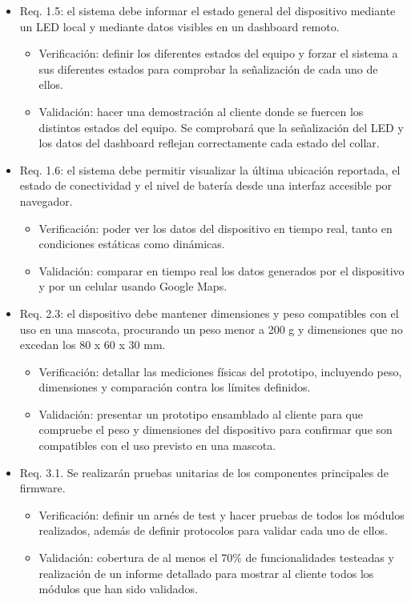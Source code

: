 \documentclass[
11pt, %
]{charter}
\begin{document}
\begin{itemize}
	\item Req. 1.5: el sistema debe informar el estado general del dispositivo mediante un LED local y mediante datos visibles en un dashboard remoto.
	\begin{itemize}
		\item Verificación: definir los diferentes estados del equipo y forzar el sistema a sus diferentes estados para comprobar la señalización de cada uno de ellos.
		\item Validación: hacer una demostración al cliente donde se fuercen los distintos estados del equipo. Se comprobará que la señalización del LED y los datos del dashboard reflejan correctamente cada estado del collar.
	\end{itemize}

	\item Req. 1.6: el sistema debe permitir visualizar la última ubicación reportada, el estado de conectividad y el nivel de batería desde una interfaz accesible por navegador.
	\begin{itemize}
		\item Verificación: poder ver los datos del dispositivo en tiempo real, tanto en condiciones estáticas como dinámicas.
		\item Validación: comparar en tiempo real los datos generados por el dispositivo y por un celular usando Google Maps.
	\end{itemize}

	\item Req. 2.3: el dispositivo debe mantener dimensiones y peso compatibles con el uso en una mascota, procurando un peso menor a 200 g y dimensiones que no excedan los 80 x 60 x 30 mm.
	\begin{itemize}
		\item Verificación: detallar las mediciones físicas del prototipo, incluyendo peso, dimensiones y comparación contra los límites definidos.
		\item Validación: presentar un prototipo ensamblado al cliente para que compruebe el peso y dimensiones del dispositivo para confirmar que son compatibles con el uso previsto en una mascota.
	\end{itemize}


	\item Req. 3.1. Se realizarán pruebas unitarias de los componentes principales de firmware.
	\begin{itemize}
		\item Verificación: definir un arnés de test y hacer pruebas de todos los módulos realizados, además de definir protocolos para validar cada uno de ellos.
		\item Validación: cobertura de al menos el 70\% de funcionalidades testeadas y realización de un informe detallado para mostrar al cliente todos los módulos que han sido validados.
	\end{itemize}
	

\end{itemize}
\end{document}
